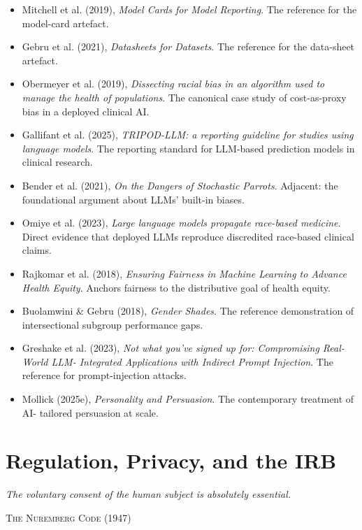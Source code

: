 \documentclass[
  letterpaper,
  11pt]{scrbook}
\providecommand{\tightlist}{%
  \setlength{\itemsep}{0pt}\setlength{\parskip}{0pt}}
\begin{document}
\begin{itemize}
\tightlist
\item
  Mitchell et al. (2019), \emph{Model Cards for Model Reporting}. The
  reference for the model-card artefact.
\item
  Gebru et al. (2021), \emph{Datasheets for Datasets}. The reference for
  the data-sheet artefact.
\item
  Obermeyer et al. (2019), \emph{Dissecting racial bias in an algorithm
  used to manage the health of populations}. The canonical case study of
  cost-as-proxy bias in a deployed clinical AI.
\item
  {Gallifant et al.} (2025), \emph{TRIPOD-LLM: a reporting guideline for
  studies using language models}. The reporting standard for LLM-based
  prediction models in clinical research.
\item
  Bender et al. (2021), \emph{On the Dangers of Stochastic Parrots}.
  Adjacent: the foundational argument about LLMs' built-in biases.
\item
  Omiye et al. (2023), \emph{Large language models propagate race-based
  medicine}. Direct evidence that deployed LLMs reproduce discredited
  race-based clinical claims.
\item
  Rajkomar et al. (2018), \emph{Ensuring Fairness in Machine Learning to
  Advance Health Equity}. Anchors fairness to the distributive goal of
  health equity.
\item
  Buolamwini \& Gebru (2018), \emph{Gender Shades}. The reference
  demonstration of intersectional subgroup performance gaps.
\item
  Greshake et al. (2023), \emph{Not what you've signed up for:
  Compromising Real-World LLM- Integrated Applications with Indirect
  Prompt Injection}. The reference for prompt-injection attacks.
\item
  Mollick (2025e), \emph{Personality and Persuasion}. The contemporary
  treatment of AI- tailored persuasion at scale.
\end{itemize}

\chapter{Regulation, Privacy, and the IRB}\label{sec-regulation-irb}

\begin{flushright}\small

\emph{The voluntary consent of the human subject is absolutely
essential.}

\textsc{The Nuremberg Code} (1947)

\end{flushright}
\end{document}
